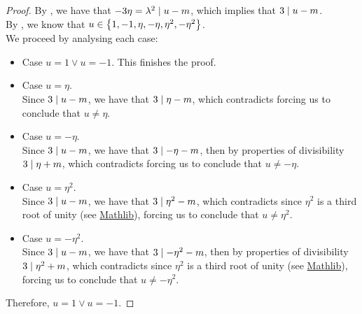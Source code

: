 \begin{proof}
    \leanok
    By , we have that $-3\eta = \lambda^2 \mid u - m$, which implies that
    $3 \mid u - m$.\\
    By , we know that $u \in \left\{1, -1, \eta, -\eta, \eta^2, -\eta^2\right\}$. \\
    We proceed by analysing each case:
    \begin{itemize}
        \item Case $u = 1 \lor u = -1$. This finishes the proof.
        \item Case $u = \eta$.\\
              Since $3 \mid u - m$, we have that $3 \mid \eta - m$, which contradicts
               forcing us to conclude that $u \neq \eta$.
        \item Case $u = -\eta$.\\
              Since $3 \mid u - m$, we have that $3 \mid - \eta - m$, then by properties of
              divisibility $3 \mid \eta + m$, which contradicts
               forcing us to conclude that $u \neq -\eta$.
        \item Case $u = \eta^2$.\\
              Since $3 \mid u - m$, we have that $3 \mid \eta^2 - m$, which contradicts
               since $\eta^2$ is a third root of unity
              (see \href{https://pitmonticone.github.io/FLT3/docs/Mathlib/RingTheory/RootsOfUnity/Basic.html#IsPrimitiveRoot.pow_of_coprime}{Mathlib}),
              forcing us to conclude that $u \neq \eta^2$.
        \item Case $u = -\eta^2$.\\
              Since $3 \mid u - m$, we have that $3 \mid - \eta^2 - m$, then by properties of
              divisibility $3 \mid \eta^2 + m$, which contradicts
               since $\eta^2$ is a third root of unity
              (see \href{https://pitmonticone.github.io/FLT3/docs/Mathlib/RingTheory/RootsOfUnity/Basic.html#IsPrimitiveRoot.pow_of_coprime}{Mathlib}),
              forcing us to conclude that $u \neq -\eta^2$.
    \end{itemize}
    Therefore, $u = 1 \lor u = -1$.
\end{proof}

